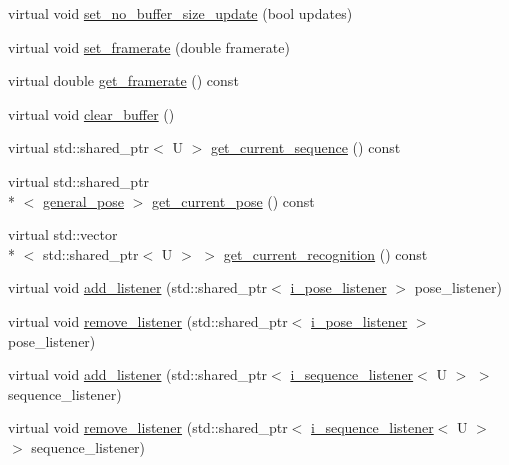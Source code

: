 \begin{DoxyCompactItemize}
\item 
virtual void \hyperlink{classmae_1_1movement__controller_a32f047751311a4e179d7cdad365bcadc}{set\-\_\-no\-\_\-buffer\-\_\-size\-\_\-update} (bool updates)
\item 
virtual void \hyperlink{classmae_1_1movement__controller_a6f99fd37e6d7459d311ba3cbcccbdea1}{set\-\_\-framerate} (double framerate)
\item 
virtual double \hyperlink{classmae_1_1movement__controller_af7f0769f77719733e2c73b9830d670fa}{get\-\_\-framerate} () const 
\item 
virtual void \hyperlink{classmae_1_1movement__controller_a694dc82c3222059711fa3a2ac6eb8ec2}{clear\-\_\-buffer} ()
\item 
virtual std\-::shared\-\_\-ptr$<$ U $>$ \hyperlink{classmae_1_1movement__controller_a8047034c7af70d1be6c63a33c8c7192c}{get\-\_\-current\-\_\-sequence} () const 
\item 
virtual std\-::shared\-\_\-ptr\\*
$<$ \hyperlink{classmae_1_1general__pose}{general\-\_\-pose} $>$ \hyperlink{classmae_1_1movement__controller_af6d4e2103bb880f25e43b93b6d83053a}{get\-\_\-current\-\_\-pose} () const 
\item 
virtual std\-::vector\\*
$<$ std\-::shared\-\_\-ptr$<$ U $>$ $>$ \hyperlink{classmae_1_1movement__controller_a58a04cf526d0deeffa7d4820619c41b5}{get\-\_\-current\-\_\-recognition} () const 
\item 
virtual void \hyperlink{classmae_1_1movement__controller_a7a150591c820312528d5b11e32646455}{add\-\_\-listener} (std\-::shared\-\_\-ptr$<$ \hyperlink{classmae_1_1i__pose__listener}{i\-\_\-pose\-\_\-listener} $>$ pose\-\_\-listener)
\item 
virtual void \hyperlink{classmae_1_1movement__controller_a5d77a42ac7427ae562d042ebbc6ce30b}{remove\-\_\-listener} (std\-::shared\-\_\-ptr$<$ \hyperlink{classmae_1_1i__pose__listener}{i\-\_\-pose\-\_\-listener} $>$ pose\-\_\-listener)
\item 
virtual void \hyperlink{classmae_1_1movement__controller_ade907e35d832e9ec5ec6fc2797df882f}{add\-\_\-listener} (std\-::shared\-\_\-ptr$<$ \hyperlink{classmae_1_1i__sequence__listener}{i\-\_\-sequence\-\_\-listener}$<$ U $>$ $>$ sequence\-\_\-listener)
\item 
virtual void \hyperlink{classmae_1_1movement__controller_af8e7fed43a0b64d09b7fbb22052ba635}{remove\-\_\-listener} (std\-::shared\-\_\-ptr$<$ \hyperlink{classmae_1_1i__sequence__listener}{i\-\_\-sequence\-\_\-listener}$<$ U $>$ $>$ sequence\-\_\-listener)

\end{DoxyCompactItemize}
